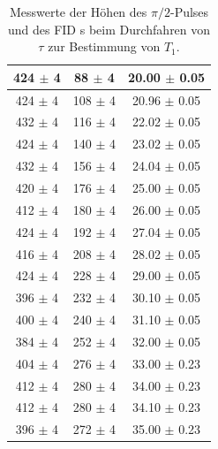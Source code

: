 \documentclass[12pt,a4paper]{article}
\begin{document}
\begin{table}
\begin{tabular}{|c|c|c|}
\hline 
424 $\pm$ 4 & 88 $\pm$ 4 & 20.00 $\pm$ 0.05 \\ 
\hline 
424 $\pm$ 4 & 108 $\pm$ 4 & 20.96 $\pm$ 0.05 \\ 
\hline 
432 $\pm$ 4 & 116 $\pm$ 4 & 22.02 $\pm$ 0.05 \\ 
\hline 
424 $\pm$ 4 & 140 $\pm$ 4 & 23.02 $\pm$ 0.05 \\ 
\hline 
432 $\pm$ 4 & 156 $\pm$ 4 & 24.04 $\pm$ 0.05 \\ 
\hline 
420 $\pm$ 4 & 176 $\pm$ 4 & 25.00 $\pm$ 0.05 \\ 
\hline 
412 $\pm$ 4 & 180 $\pm$ 4 & 26.00 $\pm$ 0.05 \\ 
\hline 
424 $\pm$ 4 & 192 $\pm$ 4 & 27.04 $\pm$ 0.05 \\ 
\hline 
416 $\pm$ 4 & 208 $\pm$ 4 & 28.02 $\pm$ 0.05 \\ 
\hline 
424 $\pm$ 4 & 228 $\pm$ 4 & 29.00 $\pm$ 0.05 \\ 
\hline 
396 $\pm$ 4 & 232 $\pm$ 4 & 30.10 $\pm$ 0.05 \\ 
\hline 
400 $\pm$ 4 & 240 $\pm$ 4 & 31.10 $\pm$ 0.05 \\ 
\hline 
384 $\pm$ 4 & 252 $\pm$ 4 & 32.00 $\pm$ 0.05 \\ 
\hline 
404 $\pm$ 4 & 276 $\pm$ 4 & 33.00 $\pm$ 0.23 \\ 
\hline 
412 $\pm$ 4 & 280 $\pm$ 4 & 34.00 $\pm$ 0.23 \\ 
\hline 
412 $\pm$ 4 & 280 $\pm$ 4 & 34.10 $\pm$ 0.23 \\ 
\hline 
396 $\pm$ 4 & 272 $\pm$ 4 & 35.00 $\pm$ 0.23 \\ 
\hline 
\end{tabular} 
\caption{Messwerte der Höhen des $\pi /2$-Pulses und des FID s beim Durchfahren von $\tau$ zur Bestimmung von $T_1$.}
\label{tab:T1_Daten}
\end{table}
\end{document}

